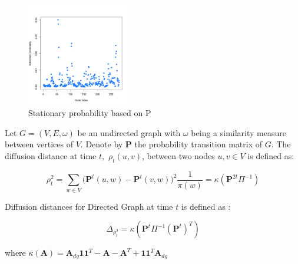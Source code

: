 \documentclass[12pt]{report}
\begin{document}
\begin{figure}[H]
\captionsetup{format=plain}
\centering
\includegraphics[width=0.4\textwidth]{../figure/statd.png}
\caption{Stationary probability based on P}
\label{fig:statd}
\end{figure}


  Let $G = (V, E, \omega)$ be an undirected graph with $\omega$ being a similarity measure between vertices of $V.$ Denote by $\textbf{P}$ the probability transition matrix of $G.$ The diffusion distance at time $t,$ $\rho_{t}(u,v)$, between two nodes $u,v \in V$ is defined as:
  
  $$\rho^2_{t} = \sum\limits_{w \in V}\big( \textbf{P}^{t}(u,w) - \textbf{P}^{t}(v,w) \big)^2 \frac{1}{\pi(w)} =  \kappa(\textbf{P}^{2t} \Pi^{-1} )$$

 
Diffusion distances for Directed Graph at time $t$ is defined as :

$$\Delta_{\rho^{2}_{t}} = \kappa(\textbf{P}^{t} \Pi^{-1} (\textbf{P}^{t})^{T} )$$
 
where $\kappa(\textbf{A}) = \textbf{A}_{dg} \textbf{1} \textbf{1}^{T} - \textbf{A} - \textbf{A}^{T} + \textbf{1} \textbf{1}^{T} \textbf{A}_{dg}$ 
\end{document}

